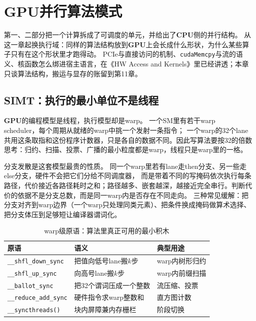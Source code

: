 \documentclass[12pt,a4paper,fontset=fandol]{ctexbook}
\newcommand{\Tp}[1]{\texttt{#1}}
\newcommand{\Dom}[1]{\textsf{\bfseries #1}}
\newcommand{\CPU}{\Dom{CPU}}
\newcommand{\GPU}{\Dom{GPU}}
\begin{document}
\chapter{GPU并行算法模式}

第一、二部分把一个计算拆成了可调度的单元，并给出了\CPU{}侧的并行结构。
从这一章起换执行域：同样的算法结构放到\GPU{}上会长成什么形状，为什么某些算子只有在这个形状里才跑得动。
PCIe与直接访问的机制、\Tp{cudaMemcpy}与流的语义、核函数怎么绑进宿主语言，在《HW Access and Kernels》里已经讲透；本章只谈算法结构，搬运与显存的账留到第11章。

\section{SIMT：执行的最小单位不是线程}

\GPU{}的编程模型是线程，执行模型却是warp。
一个SM里有若干warp scheduler，每个周期从就绪的warp中挑一个发射一条指令；
一个warp的32个lane共用这条取指和这份程序计数器，只是各自的数据不同。因此写算法要按32的倍数思考：归约、扫描、投票、广播的最小粒度都是warp，线程只是warp里的一格。

分支发散是这套模型最贵的性质。
同一个warp里若有lane走then分支、另一些走else分支，硬件不会把它们分给不同调度器，
而是带着不同的写掩码依次执行每条路径，代价接近各路径耗时之和；路径越多、嵌套越深，越接近完全串行。判断代价的依据不是分支总数，而是同一warp内是否存在不同走向。
三种常见缓解：把分支对齐到warp边界（一个warp只处理同类元素）、把条件换成掩码做算术选择、把分支体压到足够短让编译器谓词化。

\begin{table}[H]
\centering
\caption{warp级原语：算法里真正可用的最小积木}
\begin{tabular}{@{}>{\raggedright\arraybackslash}p{}
  >{\raggedright\arraybackslash}p{}
  >{\raggedright\arraybackslash}p{}@{}}
\toprule
原语&语义&典型用途\\
\midrule
\Tp{\_\_shfl\_down\_sync} &把值向低号lane搬$k$步& warp内树形归约\\
\Tp{\_\_shfl\_up\_sync} &向高号lane搬$k$步& warp内前缀扫描\\
\Tp{\_\_ballot\_sync} &把32个谓词压成一个整数&流压缩、投票\\
\Tp{\_\_reduce\_add\_sync} &硬件指令求warp整数和&直方图计数\\
\Tp{\_\_syncthreads()} &块内屏障兼内存栅栏&阶段切换\\
\bottomrule
\end{tabular}
\end{table}
\end{document}
